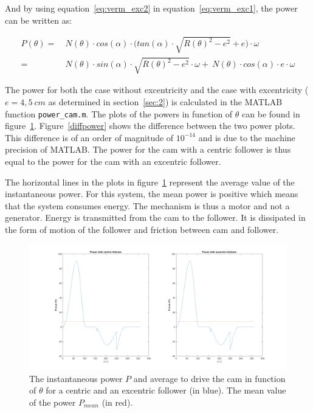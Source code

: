 \documentclass[a4paper]{article}
\begin{document}
And by using equation~\ref{eq:verm_exc2} in equation~\ref{eq:verm_exc1}, the power can be written as:

\begin{equation}
	\begin{split}
	P(\theta) =&~ N(\theta)\cdot cos(\alpha)\cdot \Big(tan(\alpha)\cdot\sqrt{R(\theta)^2-e^2}+e\Big)\cdot\omega\\
	=&~N(\theta)\cdot sin(\alpha)\cdot\sqrt{R(\theta)^2-e^2}\cdot\omega  +~N(\theta)\cdot cos(\alpha)\cdot e \cdot\omega
	\end{split}
\end{equation}

The power for both the case without excentricity and the case with excentricity (\(e=4,5~cm\) as determined in section~\ref{sec:2}) is calculated in the MATLAB function \texttt{power\_cam.m}. The plots of the powers in function of \(\theta\) can be found in figure~\ref{fig:powerplot}. Figure~\ref{diffpower} shows the difference between the two power plots. This difference is of an order of magnitude of \(10^{-14}\) and is due to the machine precision of MATLAB. The power for the cam with a centric follower is thus equal to the power for the cam with an excentric follower.

The horizontal lines in the plots in figure~\ref{fig:powerplot} represent the average value of the instantaneous power. For this system, the mean power is positive which means that the system consumes energy. The mechanism is thus a motor and not a generator. Energy is transmitted from the cam to the follower. It is dissipated in the form of motion of the follower and friction between cam and follower.

\begin{figure}
	\centering
	\includegraphics[width=\textwidth]{powerplot.png}
	\caption{The instantaneous power \(P\) and average to drive the cam in function of \(\theta\) for a centric and an excentric follower (in blue). The mean value of the power \(P_{mean}\) (in red).}
	\label{fig:powerplot}
	
\end{figure}
\end{document}
